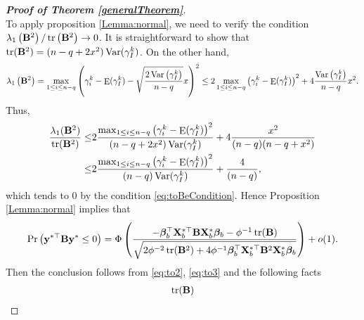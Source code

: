 \documentclass[11pt]{article}
\DeclareMathOperator{\mytr}{tr}
\DeclareMathOperator{\myE}{E}
\DeclareMathOperator{\myVar}{Var}
\newcommand{\By}{\mathbf{y}}    \newcommand{\Bz}{\mathbf{z}}
\newcommand{\bfsym}[1]{\ensuremath{\boldsymbol{#1}}}
\def\bbeta{\bfsym \beta}
\theoremstyle{plain}
\theoremstyle{definition}
\theoremstyle{remark}
\begin{document}
\begin{appendices}
\begin{proof}[\textbf{Proof of Theorem \ref{generalTheorem}}]
\begin{equation*}
\end{equation*}
To apply proposition \ref{Lemma:normal}, we need to verify the condition $\lambda_1\left( \BB^2 \right)/\mytr\left(  \BB^2 \right)\to 0$.
It is straightforward to show that
    $\mytr(\BB^2) =  ( n-q +2x^2 ) \myVar ( \gamma_I^k )$.
    On the other hand,
\begin{equation*}
    \lambda_1\left( \BB^2 \right) 
    =\max_{1\leq i \leq n-q}
    \left( 
    \gamma_i^k
        -
            \myE (\gamma_I^k)
        -
        \sqrt{
            \frac{2\myVar\left( \gamma_I^k \right)}{n-q} 
        }
        x
    \right)^2
    \leq
    2
    \max_{1\leq i \leq n-q}
    \left( 
    \gamma_i^k
        -
            \myE (\gamma_I^k)
    \right)^2
        +
        4
            \frac{\myVar\left( \gamma_I^k \right)}{n-q} 
        x^2
        .
\end{equation*}
Thus,
\begin{equation*}
    \begin{split}
    \frac{
        \lambda_1(\BB^2)
    }{
        \mytr(\BB^2)
    } 
    \leq
    &
    2
    \frac{
        \max_{1\leq i \leq n-q}
        \left( 
        \gamma_i^k
            -
                \myE (\gamma_I^k)
        \right)^2
    }{
        (n-q+2x^2) \myVar (\gamma_I^k)
    }
    +4\frac{
        x^2
    }{
        (n-q)(n-q+x^2)
    }
    \\
    \leq&
    2
    \frac{
        \max_{1\leq i \leq n-q}
        \left( 
        \gamma_i^k
            -
                \myE (\gamma_I^k)
        \right)^2
    }{
        (n-q) \myVar (\gamma_I^k)
    }
    +\frac{
        4
    }{
        (n-q)
    },
    \end{split}
\end{equation*}
which tends to $0$ by the condition \eqref{eq:toBeCondition}.
Hence Proposition \ref{Lemma:normal} implies that
\begin{equation}\label{eq:to3}
    \Pr\left( 
            \By^{*\top}
            \BB
            \By^*
            \leq 0
    \right) 
=
    \Phi\left( 
    \frac{
        -\bbeta_b^{\top} \BX_b^{*\top} \BB \BX_b^* \bbeta_b
        -\phi^{-1} \mytr(\BB)
    }{
    \sqrt{
        2\phi^{-2}
        \mytr(\BB^2)
        +4\phi^{-1}
        \bbeta_b^\top
        \BX_b^{*\top}
        \BB^2
        \BX_b^*
        \bbeta_b
    }
    }
\right)
+o(1)
.
\end{equation}
Then the conclusion follows from \eqref{eq:to2}, \eqref{eq:to3} and the following facts
\begin{align*}
    \mytr(\BB)

\end{align*}
\end{proof}
\end{appendices}
\end{document}
